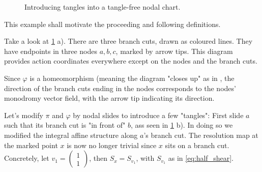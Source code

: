 \documentclass[12pt,a4paper,abstract=true,draft]{scrartcl}
\newcommand\mqty[1]{\begin{pmatrix}#1\end{pmatrix}}
\begin{document}
\begin{example}
\begin{figure}
    \caption{Introducing tangles into a tangle-free nodal chart.}
    \label{fig:building_tangles}
  \end{figure}
  This example shall motivate the proceeding and following definitions.

  Take a look at \cref{fig:building_tangles} a).
  There are three branch cuts, drawn as coloured lines.
  They have endpoints in three nodes $a,b,c$, marked by arrow tips.
  This diagram provides action coordinates everywhere except on the nodes and the branch cuts.

  Since $φ$ is a homeomorphism (meaning the diagram "closes up" as in \cite[Section 7.2]{evans2021atfs}, the direction of the branch cuts ending in the nodes corresponds to the nodes' monodromy vector field, with the arrow tip indicating its direction.


  Let's modify $π$ and $φ$ by nodal slides to introduce a few "tangles": First slide $a$ such that its branch cut is "in front of" $b$, ass seen in \cref{fig:building_tangles} b).
  In doing so we modified the integral affine structure along $a$'s branch cut. 
  The resolution map at the marked point $x$ is now no longer trivial since $x$ sits on a branch cut.
  Concretely, let $v_1 = \mqty{1\\1}$, then $S_x = S_{v_1}$, with $S_{v_1}$ as in \eqref{eq:half_shear}.


\end{example}
\end{document}
